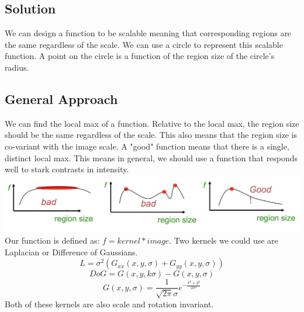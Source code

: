 \documentclass{article}
\begin{document}
\subsection{Solution}
We can design a function to be scalable meaning that corresponding regions are the same regardless of the scale. We can use a circle to represent this scalable function. A point on the circle is a function of the region size of the circle's radius. 
\subsection{General Approach}
We can find the local max of a function. Relative to the local max, the region size should be the same regardless of the scale. This also means that the region size is co-variant with the image scale. A "good" function means that there is a single, distinct local max. This means in general, we should use a function that responds well to stark contrasts in intensity. \\
\includegraphics[scale=0.5]{scaleinvariant.png}\\
Our function is defined as: $f = kernel*image$. Two kernels we could use are Laplacian or Difference of Gaussians. $$L = \sigma^2(G_{xx}(x,y,\sigma)+G_{yy}(x,y,\sigma))$$ $$DoG = G(x,y,k\sigma) - G(x,y,\sigma)$$ $$G(x,y,\sigma) = \frac{1}{\sqrt{2\pi}\sigma}e^{-\frac{x^2+y^2}{2\sigma^2}}$$
Both of these kernels are also scale and rotation invariant.




\small


\end{document}
